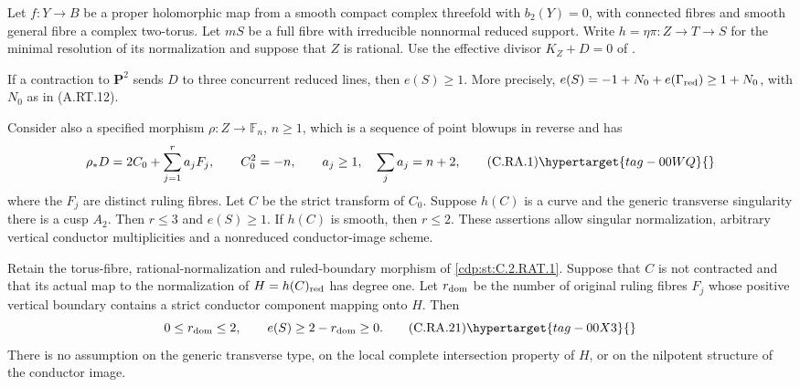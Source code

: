 \begin{proposition}\hypertarget{tag-01CD}{}\label{cdp:st:C.2.RAT.1}


Let $f:Y\to B$ be a proper holomorphic map from a smooth compact
complex threefold with $b_2(Y)=0$, with connected fibres and smooth
general fibre a complex two-torus. Let $mS$ be a full fibre with
irreducible nonnormal reduced support. Write
$h=\eta\pi:Z\to T\to S$ for the minimal resolution of its
normalization and suppose that $Z$ is rational. Use the effective
divisor $K_Z+D=0$ of .

If a contraction to $\mathbf P^2$ sends $D$ to three concurrent
reduced lines, then $e(S)\ge1$. More precisely,
$e(S)=-1+N_0+e(\Gamma_{\rm red})\ge1+N_0$, with $N_0$ as in
(A.RT.12).

Consider also a specified morphism $\rho:Z\to\mathbb F_n$,
$n\ge1$, which is a sequence of point blowups in reverse and has
\[
 \rho_*D=2C_0+\sum_{j=1}^r a_jF_j,\qquad
 C_0^2=-n,\qquad
 a_j\ge1,\quad \sum_j a_j=n+2,                  \tag{C.RA.1}\hypertarget{tag-00WQ}{}\label{cdp:eq:C.RA.1}
\]
where the $F_j$ are distinct ruling fibres. Let $C$ be the
strict transform of $C_0$. Suppose $h(C)$ is a curve and the
generic transverse singularity there is a cusp $A_2$.
Then $r\le3$ and $e(S)\ge1$. If $h(C)$ is smooth, then
$r\le2$. These assertions allow singular normalization,
arbitrary vertical conductor multiplicities and a nonreduced
conductor-image scheme.
\end{proposition}

\begin{proposition}\hypertarget{tag-01CF}{}\label{cdp:st:C.2.RAT.3}


Retain the torus-fibre, rational-normalization and ruled-boundary
morphism of \ref{cdp:st:C.2.RAT.1}. Suppose that $C$ is not contracted and
that its actual map to the normalization of
$H=h(C)_{\rm red}$ has degree one. Let $r_{\rm dom}$ be the
number of original ruling fibres $F_j$ whose positive vertical
boundary contains a strict conductor component mapping onto
$H$. Then
\[
       0\le r_{\rm dom}\le2,\qquad
       e(S)\ge2-r_{\rm dom}\ge0.
\tag{C.RA.21}\hypertarget{tag-00X3}{}\label{cdp:eq:C.RA.21}
\]
There is no assumption on the generic transverse type, on the
local complete intersection property of $H$, or on the
nilpotent structure of the conductor image.
\end{proposition}


